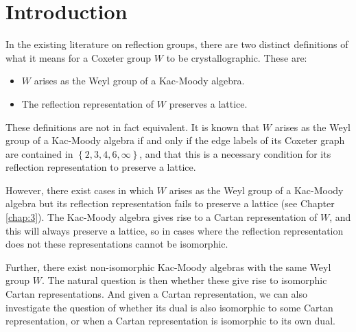 \documentclass[11pt,a4paper]{report}
\theoremstyle{definition}
\begin{document}





\chapter{Introduction}

In the existing literature on reflection groups, there are two distinct definitions of what it means for a Coxeter group $W$ to be crystallographic. These are:
\begin{itemize}
    \item $W$ arises as the Weyl group of a Kac-Moody algebra.
    \item The reflection representation of $W$ preserves a lattice. 
\end{itemize}

These definitions are not in fact equivalent. It is known that $W$ arises as the Weyl group of a Kac-Moody algebra if and only if the edge labels of its Coxeter graph are contained in $\left\{2,3,4,6,\infty\right\}$, and that this is a necessary condition for its reflection representation to preserve a lattice. 

However, there exist cases in which $W$ arises as the Weyl group of a Kac-Moody algebra but its reflection representation fails to preserve a lattice (see Chapter \ref{chap:3}). The Kac-Moody algebra gives rise to a Cartan representation of $W$, and this will always preserve a lattice, so in cases where the reflection representation does not these representations cannot be isomorphic. 

Further, there exist non-isomorphic Kac-Moody algebras with the same Weyl group $W$. The natural question is then whether these give rise to isomorphic Cartan representations. And given a Cartan representation, we can also investigate the question of whether its dual is also isomorphic to some Cartan representation, or when a Cartan representation is isomorphic to its own dual. 
\end{document}

